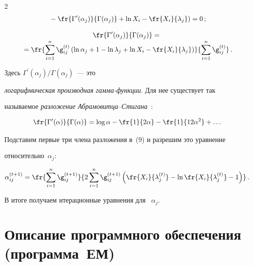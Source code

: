\begin{multicols}{2}
\begin{multline*}
\left. {}-\fr{\Gamma^\prime (\alpha_j )}{\Gamma (\alpha_j )}+\ln X_i 


-\fr{X_i}{\lambda_j} \right) =0\,;


\end{multline*}


\begin{multline}


\fr{\Gamma^\prime (\alpha_j )}{\Gamma (\alpha_j )} ={}\\[-3pt]


{}= \fr{\sum\limits_{i=1}^n \g_{ij}^{(t)} \left ( \ln \alpha_j +1-\ln\lambda_j 


+\ln X_i -\fr{X_i}{\lambda_j} \right )}{\sum\limits_{i=1}^n \g_{ij}^{(t)}}\,.


\end{multline}


%


Здесь $\Gamma^\prime (\alpha_j ) / \Gamma (\alpha_j )$~--- это


\textit{логарифмическая производная гамма-функции}. Для нее существует так


называемое \textit{разложение Абрамовитца}--\textit{Стигана}~\cite{4bat}:


$$


\fr{\Gamma^\prime (\alpha ) }{ \Gamma (\alpha )} = \mathrm{log}\,\alpha -


\fr{1}{2\alpha }-\fr{1}{12\alpha^2 }+\ldots


$$





Подставим первые три члена разложения в~(9) и разрешим это уравнение


относительно~$\alpha_j$:


$$


\alpha_{ij}^{(t+1)} = \fr{\sum\limits_{i=1}^n


\g_{ij}^{(t+1)}}{2\sum\limits_{i=1}^n \g_{ij}^{(t +1)}\left ( \fr{X_i}{\lambda_j^{(t)}} -


\ln \fr{X_i}{\lambda_j^{(t)}} -1\right )}\,.


$$


В итоге получаем итерационные уравнения для ~$\alpha_j$.





\section{Описание программного обеспечения (программа~ЕМ)}






\end{multicols}
